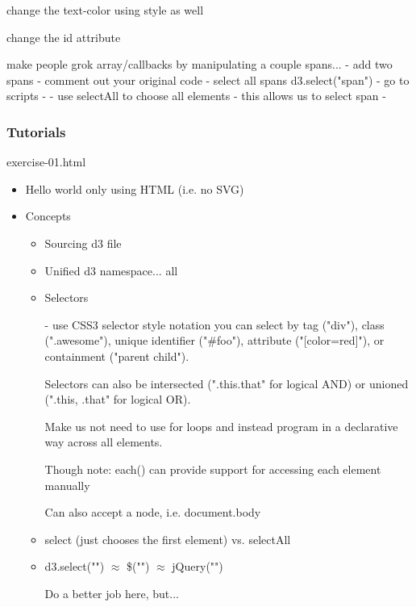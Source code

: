 \documentclass{beamer}
\begin{document}
change the text-color using style as well

change the id attribute 


make people grok array/callbacks by manipulating a couple spans...
    - add two spans
    - comment out your original code
    - select all spans d3.select("span")
    - go to scripts
    - 
    - use selectAll to choose all elements
    - this allows us to select span
    - 


\begin{frame}
    \frametitle{Tutorials}
    \begin{block}{exercise-01.html}
        \begin{itemize}
            \pause
            \item  Hello world only using HTML (i.e. no SVG)
            \pause
            \item  Concepts
            \begin{itemize}
                \pause
    			\item Sourcing d3 file 
                \pause
                \item Unified d3 namespace... all 
                \pause
                \item Selectors
                \pause
                \begin{itemize}
                        - use CSS3 selector style notation
                     you can select by tag ("div"), class (".awesome"), unique identifier ("#foo"), attribute ("[color=red]"), or containment ("parent child").

                     Selectors can also be intersected (".this.that" for logical AND) or unioned (".this, .that" for logical OR).

                     Make us not need to use for loops and instead program in a declarative way across all elements.

                     Though note: each() can provide support for accessing each element manually

                     Can also accept a node, i.e. document.body
                \end{itemize}
                \pause
                \item select (just chooses the first element) vs. selectAll
                \item d3.select("") $\approx$ \$("") $\approx$ jQuery("")
                \pause

Do a better job here, but... 



\end{itemize}
\end{itemize}
\end{block}
\end{frame}
\end{document}
